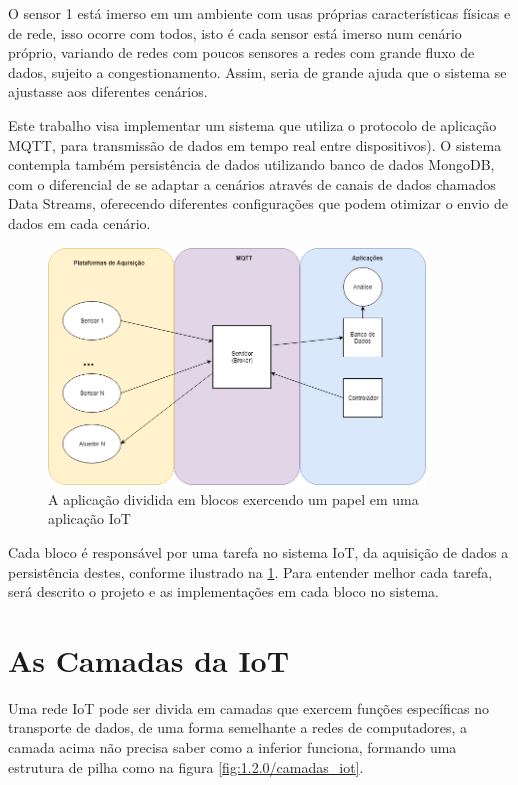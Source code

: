 O sensor 1 está imerso em um ambiente com usas próprias características físicas e de rede, isso ocorre com todos, isto é cada sensor está imerso num cenário próprio, variando de redes com poucos sensores a redes com grande fluxo de dados, sujeito a congestionamento. Assim, seria de grande ajuda que o  sistema se ajustasse aos diferentes cenários.

Este trabalho visa implementar um sistema que utiliza o protocolo de aplicação MQTT, para transmissão de dados em tempo real entre dispositivos). O sistema contempla também persistência de dados utilizando banco de dados MongoDB, com o diferencial de se adaptar a cenários através de canais de dados chamados Data Streams, oferecendo diferentes configurações que podem otimizar o envio de dados em cada cenário.

\begin{figure}[h!]
\centering
\includegraphics[width=10cm]{./02_Capitulos/02_Cap1/figures/iot_app-layers}
\caption{A aplicação dividida em blocos exercendo um papel em uma aplicação IoT}
\label{fig:1.1.0/iot_app-layers}
\end{figure}


Cada bloco é responsável por uma tarefa no sistema IoT, da aquisição de dados a persistência destes, conforme ilustrado na \ref{fig:1.1.0/iot_app-layers}. Para entender melhor cada tarefa, será descrito o projeto e as implementações em cada bloco no sistema.

\section{As Camadas da IoT}
\label{section:camadas_iot}

Uma rede IoT pode ser divida em camadas que exercem funções específicas no transporte de dados, de uma forma semelhante a redes de computadores, a camada acima não precisa saber como a inferior funciona, formando uma estrutura de pilha como na figura \ref{fig:1.2.0/camadas_iot}.

